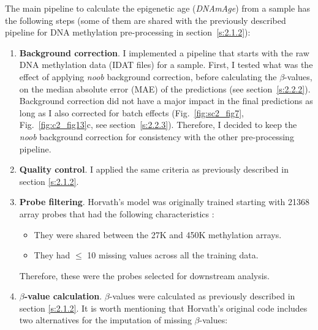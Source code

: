 \bigskip

The main pipeline to calculate the epigenetic age (\textit{DNAmAge}) from a sample has the following steps (some of them are shared with the previously described pipeline for DNA methylation pre-processing in section~\ref{s:2.1.2}):

\begin{enumerate}
	
	\item \textbf{Background correction}. I implemented a pipeline that starts with the raw DNA methylation data (IDAT files) for a sample. First, I tested what was the effect of applying \textit{noob} background correction, before calculating the $\beta$-values, on the median absolute error (MAE) of the predictions (see section~\ref{s:2.2.2}).  Background correction did not have a major impact in the final predictions as long as I also corrected for batch effects (Fig.~\ref{fig:sc2_fig7}, Fig.~\ref{fig:c2_fig13}c, see section~\ref{s:2.2.3}). Therefore, I decided to keep the \textit{noob} background correction for consistency with the other pre-processing pipeline.
	
	\item \textbf{Quality control}. I applied the same criteria as previously described in section \ref{s:2.1.2}.
	
	\item \textbf{Probe filtering}. Horvath's model was originally trained starting with 21368 array probes that had the following characteristics \cite{Horvath2013}:
	
	\begin{itemize}
		
		\item They were shared between the 27K and 450K methylation arrays.
		
		\item They had $\leq$ 10 missing values across all the training data.
		
	\end{itemize}
	
	 Therefore, these were the probes selected for downstream analysis.
	
	\item \textbf{$\beta$-value calculation}. $\beta$-values were calculated as previously described in section \ref{s:2.1.2}. It is worth mentioning that Horvath's original code includes two alternatives for the imputation of missing $\beta$-values:
	
	\begin{itemize}
		

\end{itemize}
\end{enumerate}
